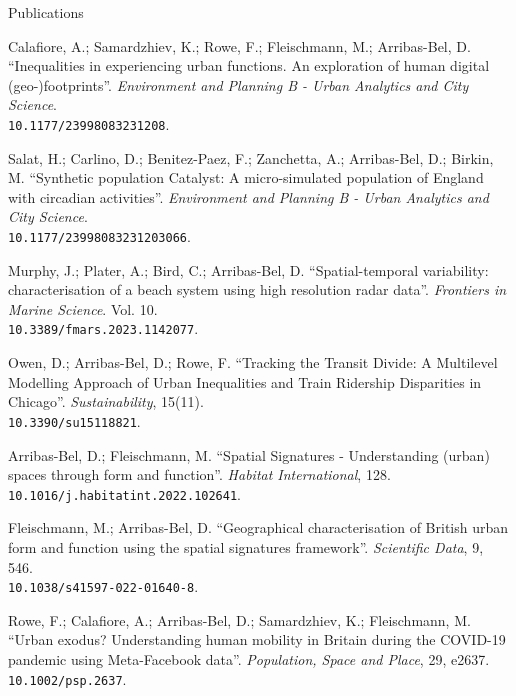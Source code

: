 \documentclass[12pt,2up]{article}
\begin{document}
\begin{cv}{}
\begin{cvlist}{Publications}
\item[\textit{2023}] Calafiore, A.; Samardzhiev, K.; Rowe, F.;
        Fleischmann, M.; Arribas-Bel, D.
        ``Inequalities in experiencing urban functions.
        An exploration of human digital (geo-)footprints''.
        \emph{Environment and Planning B - Urban Analytics and City Science}.\\
        \texttt{10.1177/23998083231208}.
\item[] Salat, H.; Carlino, D.; Benitez-Paez, F.; Zanchetta, A.;
        Arribas-Bel, D.; Birkin, M.
        ``Synthetic population Catalyst: A micro-simulated population of
        England with circadian activities''.
        \emph{Environment and Planning B - Urban Analytics and City Science}. \\
        \texttt{10.1177/23998083231203066}.
\item[\textit{}] Murphy, J.; Plater, A.; Bird, C.; Arribas-Bel, D.
        ``Spatial-temporal variability: characterisation of a beach system
        using high resolution radar data''.
        \emph{Frontiers in Marine Science}. Vol. 10. \\
        \texttt{10.3389/fmars.2023.1142077}.
\item[] Owen, D.; Arribas-Bel, D.; Rowe, F.
        ``Tracking the Transit Divide: A Multilevel Modelling Approach of Urban Inequalities
        and Train Ridership Disparities in Chicago''.
        \emph{Sustainability}, 15(11). \\
        \texttt{10.3390/su15118821}.
\item[\textit{2022}] Arribas-Bel, D.; Fleischmann, M.
        ``Spatial Signatures - Understanding (urban) spaces through form and function''.
        \emph{Habitat International}, 128. \\
        \texttt{10.1016/j.habitatint.2022.102641}.

\item[] Fleischmann, M.; Arribas-Bel, D.
        ``Geographical characterisation of British urban form and function using the spatial signatures framework''.
        \emph{Scientific Data}, 9, 546. \\
        \texttt{10.1038/s41597-022-01640-8}.

\item[] Rowe, F.; Calafiore, A.; Arribas-Bel, D.; Samardzhiev, K.;
        Fleischmann, M.
        ``Urban exodus? Understanding human mobility in Britain during the
        COVID-19 pandemic using Meta-Facebook data''.
        \emph{Population, Space and Place}, 29, e2637.\\
        \texttt{10.1002/psp.2637}.


\end{cvlist}
\end{cv}
\end{document}
